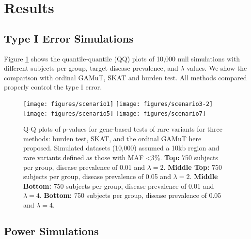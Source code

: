 \documentclass[]{article}
\begin{document}
\hypertarget{results}{%
\section{Results}\label{results}}

\hypertarget{type-i-error-simulations}{%
\subsection{Type I Error Simulations}\label{type-i-error-simulations}}

Figure \ref{fig:qq} shows the quantile-quantile (QQ) plots of 10,000
null simulations with different subjects per group, target disease
prevalence, and \(\lambda\) values. We show the comparison with ordinal
GAMuT, SKAT and burden test. All methods compared properly control the
type I error.

\begin{figure}

{\centering \texttt{[image: figures/scenario1]} \texttt{[image: figures/scenario3-2]} \texttt{[image: figures/scenario5]} \texttt{[image: figures/scenario7]} 

}

\caption{Q-Q plots of p-values for gene-based tests of rare variants for three methods: burden test, SKAT, and the ordinal GAMuT here proposed. Simulated datasets (10,000) assumed a 10kb region and rare variants defined as those with MAF <3\%. \textbf{Top:} 750 subjects per group,  disease prevalence of 0.01 and $\lambda=2$. \textbf{Middle Top:} 750 subjects per group, disease prevalence of 0.05 and $\lambda=2$. \textbf{Middle Bottom:} 750 subjects per group, disease prevalence of 0.01 and $\lambda=4$. \textbf{Bottom:} 750 subjects per group, disease prevalence of 0.05 and $\lambda=4$.}\label{fig:qq}
\end{figure}

\hypertarget{power-simulations}{%
\subsection{Power Simulations}\label{power-simulations}}
\end{document}
